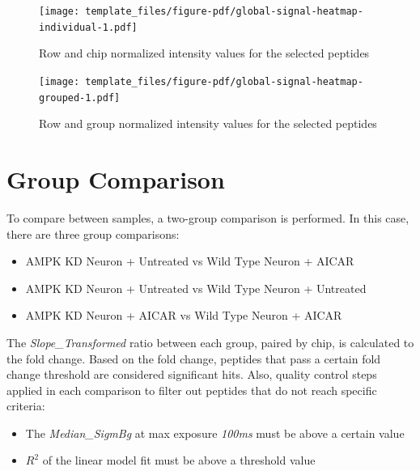 \documentclass[
  letterpaper,
  DIV=11,
  numbers=noendperiod]{scrreport}
\providecommand{\tightlist}{%
  \setlength{\itemsep}{0pt}\setlength{\parskip}{0pt}}\usepackage{longtable,booktabs,array}
\begin{document}
\begin{figure}[htbp]

{\centering \texttt{[image: template\_files/figure-pdf/global-signal-heatmap-individual-1.pdf]}

}

\caption{Row and chip normalized intensity values for the selected
peptides}

\end{figure}

\begin{figure}[htbp]

{\centering \texttt{[image: template\_files/figure-pdf/global-signal-heatmap-grouped-1.pdf]}

}

\caption{Row and group normalized intensity values for the selected
peptides}

\end{figure}

\hypertarget{group-comparison}{%
\section{Group Comparison}\label{group-comparison}}

To compare between samples, a two-group comparison is performed. In this
case, there are three group comparisons:

\begin{itemize}
\tightlist
\item
  AMPK KD Neuron + Untreated vs Wild Type Neuron + AICAR
\item
  AMPK KD Neuron + Untreated vs Wild Type Neuron + Untreated
\item
  AMPK KD Neuron + AICAR vs Wild Type Neuron + AICAR
\end{itemize}

The \emph{Slope\_Transformed} ratio between each group, paired by chip,
is calculated to the fold change. Based on the fold change, peptides
that pass a certain fold change threshold are considered significant
hits. Also, quality control steps applied in each comparison to filter
out peptides that do not reach specific criteria:

\begin{itemize}
\tightlist
\item
  The \emph{Median\_SigmBg} at max exposure \emph{100ms} must be above a
  certain value\\
\item
  \(R^2\) of the linear model fit must be above a threshold value
\end{itemize}
\end{document}
